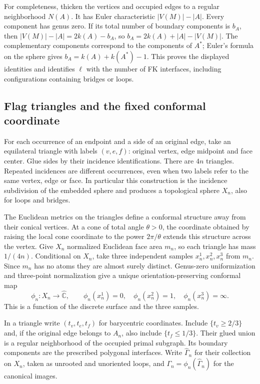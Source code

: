 \documentclass[11pt]{article}
\numberwithin{equation}{section}
\theoremstyle{definition}
\theoremstyle{remark}
\newcommand{\1}{\mathbf 1}
\begin{document}
For completeness, thicken the vertices and occupied edges to a regular
neighborhood $N(A)$. It has Euler characteristic $|V(M)|-|A|$.
Every component has genus zero. If its total number of boundary
components is $b_A$, then
$|V(M)|-|A|=2k(A)-b_A$, so $b_A=2k(A)+|A|-|V(M)|$.
The complementary components correspond to the components of $A^*$;
Euler's formula on the sphere gives $b_A=k(A)+k(A^*)-1$.
This proves the displayed identities and identifies $\ell$ with the
number of FK interfaces, including configurations containing bridges
or loops.

\subsection{Flag triangles and the fixed conformal coordinate}

For each occurrence of an endpoint and a side of an original edge,
take an equilateral triangle with labels $(v,e,f)$: original vertex,
edge midpoint and face center. Glue sides by their incidence
identifications. There are $4n$ triangles. Repeated incidences are
different occurrences, even when two labels refer to the same vertex,
edge or face. In particular this construction is the incidence
subdivision of the embedded sphere and produces a topological sphere
$X_n$, also for loops and bridges.

The Euclidean metrics on the triangles define a conformal structure
away from their conical vertices. At a cone of total angle $\theta>0$,
the coordinate obtained by raising the local cone coordinate to the
power $2\pi/\theta$ extends this structure across the vertex. Give
$X_n$ normalized Euclidean face area $m_n$, so each triangle has
mass $1/(4n)$. Conditional on $X_n$, take three independent samples
$x_n^1,x_n^2,x_n^3$ from $m_n$. Since $m_n$ has no atoms they are
almost surely distinct. Genus-zero uniformization
\cite[Theorem~II.2.15]{SaintGervais2016Uniformization} and three-point
normalization give a unique orientation-preserving conformal map
\[
 \phi_n:X_n\longrightarrow\widehat{\mathbb C},
 \qquad
 \phi_n(x_n^1)=0,\quad\phi_n(x_n^2)=1,\quad
 \phi_n(x_n^3)=\infty.
\]
This is a function of the discrete surface and the three samples.

In a triangle write $(t_v,t_e,t_f)$ for barycentric coordinates.
Include $\{t_v\ge2/3\}$ and, if the original edge belongs to $A_n$,
also include $\{t_f\le1/3\}$. Their glued union is a regular
neighborhood of the occupied primal subgraph. Its boundary components
are the prescribed polygonal interfaces. Write $\widehat\Gamma_n$
for their collection on $X_n$, taken as unrooted and unoriented loops,
and $\Gamma_n=\phi_n(\widehat\Gamma_n)$ for the canonical images.
\end{document}
